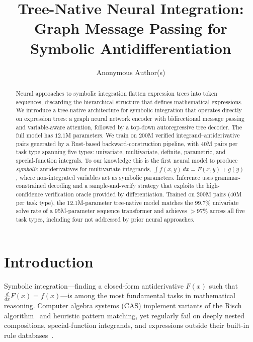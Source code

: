 \documentclass{article}
\title{Tree-Native Neural Integration: \\
  Graph Message Passing for Symbolic Antidifferentiation}
\author{%
  Anonymous Author(s)
}
\begin{document}
\maketitle

\begin{abstract}
	Neural approaches to symbolic integration flatten expression trees into token
	sequences, discarding the hierarchical structure that defines mathematical
	expressions. We introduce a tree-native architecture for symbolic integration
	that operates directly on expression trees: a graph neural network encoder with
	bidirectional message passing and variable-aware attention, followed by a
	top-down autoregressive tree decoder. The full model has $12.1$M parameters.
	We train on $200$M verified integrand--antiderivative pairs generated by a
	Rust-based backward-construction pipeline, with $40$M pairs per task type spanning five types:
	univariate, multivariate, definite, parametric, and special-function
	integrals. To our knowledge this is the first neural model to produce
	\emph{symbolic} antiderivatives for multivariate integrands,
	$\int f(x,y)\,dx = F(x,y) + g(y)$, where non-integrated variables act as
	symbolic parameters.
	Inference uses grammar-constrained decoding and a sample-and-verify strategy
	that exploits the high-confidence verification oracle provided by
differentiation.
	Trained on $200$M pairs ($40$M per task type), the $12.1$M-parameter
	tree-native model matches the $99.7\%$ univariate solve rate of a
	$95$M-parameter sequence transformer \citep{lample2020deep} and
	achieves $>97\%$ across all five task types, including four not
	addressed by prior neural approaches.
\end{abstract}


\section{Introduction}
\label{sec:intro}

Symbolic integration---finding a closed-form antiderivative $F(x)$ such that
$\tfrac{d}{dx}F(x) = f(x)$---is among the most fundamental tasks in
mathematical reasoning. Computer algebra systems (CAS) implement variants of
the Risch algorithm~\citep{risch1969problem} and heuristic pattern matching,
yet regularly fail on deeply nested compositions, special-function
integrands, and expressions outside their built-in rule
databases~\citep{moses1971symbolic}.
\end{document}
